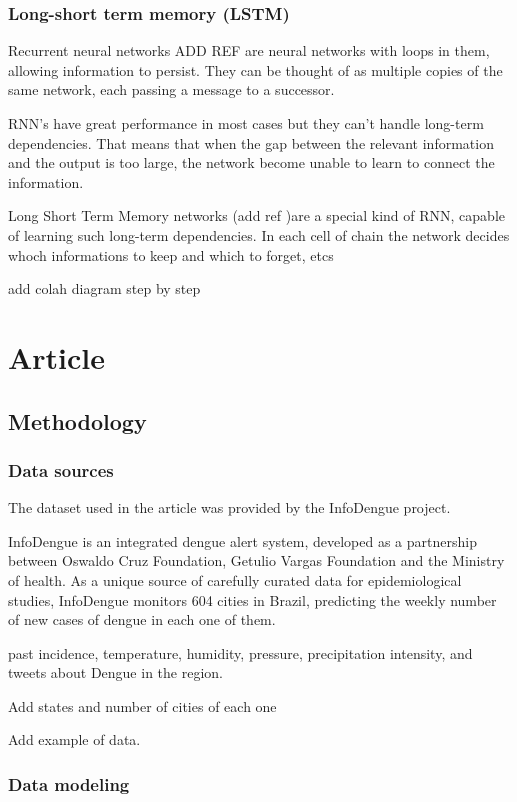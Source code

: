 \documentclass[12pt]{report}
\begin{document}
\subsection{Long-short term memory (LSTM)}

Recurrent neural networks ADD REF are neural networks with loops in them, allowing information
to persist. They can be thought of as multiple copies of the same network, each passing a message
to a successor.

RNN's have great performance  in most cases but they can't handle long-term dependencies. That 
means that when the gap between the relevant information and the output is too large, the network
become unable to learn to connect the information.

Long Short Term Memory networks (add ref )are a special kind of RNN, capable of learning
such long-term dependencies. In each cell of chain the network decides whoch informations to keep
and which to forget, etcs

add colah diagram step by step

\newpage
\chapter{Article}

\section{Methodology}


\subsection{Data sources}
The dataset used in the article was provided by the InfoDengue project. 

InfoDengue \citep{Codeco046193} is an integrated dengue alert system, developed as a partnership between Oswaldo Cruz Foundation, Getulio Vargas Foundation and the Ministry of health. As a unique source of carefully curated data for epidemiological studies, InfoDengue monitors 604 cities in Brazil, predicting the weekly number of new cases of dengue in each one of them.

 past incidence, temperature, humidity, pressure, precipitation intensity, and tweets about Dengue in the region. 

Add states and number of cities of each one 

Add example of data.

\subsection{Data modeling}
\end{document}
